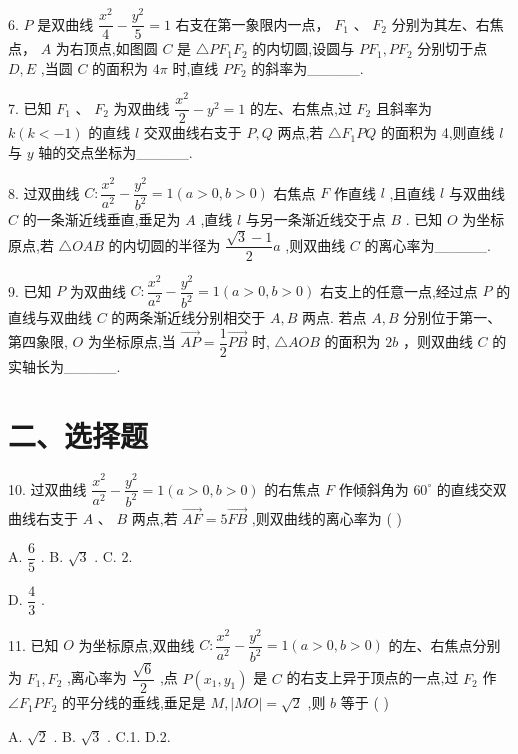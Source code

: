 6. $P$ 是双曲线 $\dfrac{{x}^{2}}{4} - \dfrac{{y}^{2}}{5} = 1$ 右支在第一象限内一点， ${F}_{1}$ 、 ${F}_{2}$ 分别为其左、右焦点， $A$ 为右顶点,如图圆 $C$ 是 $\bigtriangleup P{F}_{1}{F}_{2}$ 的内切圆,设圆与 $P{F}_{1},P{F}_{2}$ 分别切于点 $D,E$ ,当圆 $C$ 的面积为 ${4\pi }$ 时,直线 $P{F}_{2}$ 的斜率为\_\_\_\_\_.

7. 已知 ${F}_{1}$ 、 ${F}_{2}$ 为双曲线 $\dfrac{{x}^{2}}{2} - {y}^{2} = 1$ 的左、右焦点,过 ${F}_{2}$ 且斜率为 $k\left( {k <  - 1}\right)$ 的直线 $l$ 交双曲线右支于 $P,Q$ 两点,若 $\bigtriangleup {F}_{1}{PQ}$ 的面积为 4,则直线 $l$ 与 $y$ 轴的交点坐标为\_\_\_\_\_.

8. 过双曲线 $C : \dfrac{{x}^{2}}{{a}^{2}} - \dfrac{{y}^{2}}{{b}^{2}} = 1\left( {a > 0,b > 0}\right)$ 右焦点 $F$ 作直线 $l$ ,且直线 $l$ 与双曲线 $C$ 的一条渐近线垂直,垂足为 $A$ ,直线 $l$ 与另一条渐近线交于点 $B$ . 已知 $O$ 为坐标原点,若 $\bigtriangleup {OAB}$ 的内切圆的半径为 $\dfrac{\sqrt{3} - 1}{2}a$ ,则双曲线 $C$ 的离心率为\_\_\_\_\_.

9. 已知 $P$ 为双曲线 $C : \dfrac{{x}^{2}}{{a}^{2}} - \dfrac{{y}^{2}}{{b}^{2}} = 1\left( {a > 0,b > 0}\right)$ 右支上的任意一点,经过点 $P$ 的直线与双曲线 $C$ 的两条渐近线分别相交于 $A,B$ 两点. 若点 $A,B$ 分别位于第一、第四象限, $O$ 为坐标原点,当 $\overrightarrow{AP} = \dfrac{1}{2}\overrightarrow{PB}$ 时, $\bigtriangleup {AOB}$ 的面积为 ${2b}$ ，则双曲线 $C$ 的实轴长为\_\_\_\_\_.

\section*{二、选择题}

10. 过双曲线 $\dfrac{{x}^{2}}{{a}^{2}} - \dfrac{{y}^{2}}{{b}^{2}} = 1\left( {a > 0,b > 0}\right)$ 的右焦点 $F$ 作倾斜角为 ${60}^{ \circ  }$ 的直线交双曲线右支于 $A$ 、 $B$ 两点,若 $\overrightarrow{AF} = 5\overrightarrow{FB}$ ,则双曲线的离心率为 ( )

A. $\dfrac{6}{5}$ . B. $\sqrt{3}$ . C. 2.

D. $\dfrac{4}{3}$ .

11. 已知 $O$ 为坐标原点,双曲线 $C : \dfrac{{x}^{2}}{{a}^{2}} - \dfrac{{y}^{2}}{{b}^{2}} = 1\left( {a > 0,b > 0}\right)$ 的左、右焦点分别为 ${F}_{1},{F}_{2}$ ,离心率为 $\dfrac{\sqrt{6}}{2}$ ,点 $P\left( {{x}_{1},{y}_{1}}\right)$ 是 $C$ 的右支上异于顶点的一点,过 ${F}_{2}$ 作 $\angle {F}_{1}P{F}_{2}$ 的平分线的垂线,垂足是 $M,\left| {MO}\right|  = \sqrt{2}$ ,则 $b$ 等于 ( )

A. $\sqrt{2}$ . B. $\sqrt{3}$ . C.1. D.2.

